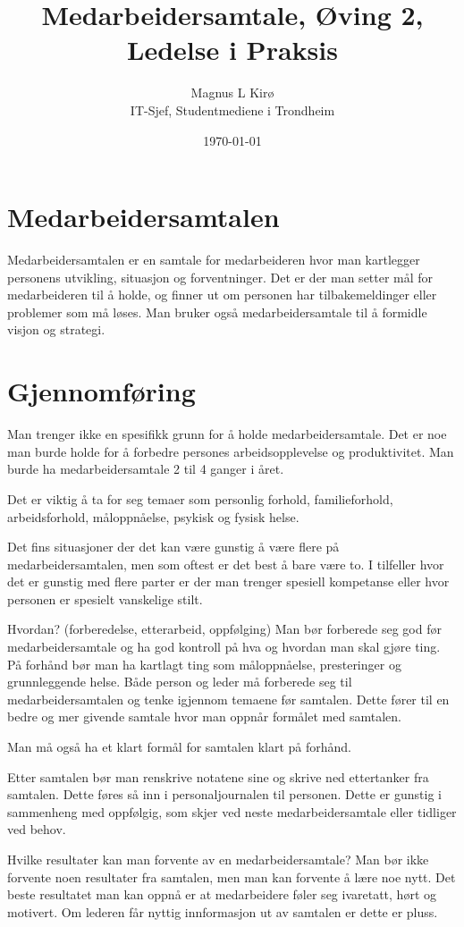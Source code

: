 \documentclass[12pt, a4paper]{article}
\title{
	Medarbeidersamtale, Øving 2, Ledelse i Praksis
}
\author{
	Magnus L Kirø \\
	IT-Sjef, Studentmediene i Trondheim 
}
\date{\today}
\begin{document}
\maketitle
{}

\section{Medarbeidersamtalen}
Medarbeidersamtalen er en samtale for medarbeideren hvor man
kartlegger personens utvikling, situasjon og forventninger. Det er der man
setter mål for medarbeideren til å holde, og finner ut om personen har
tilbakemeldinger eller problemer som må løses. 
Man bruker også medarbeidersamtale til å formidle visjon og strategi.

\section{Gjennomføring}
Man trenger ikke en spesifikk grunn for å holde medarbeidersamtale. Det er noe
man burde holde for å forbedre persones arbeidsopplevelse og produktivitet.
Man burde ha medarbeidersamtale 2 til 4 ganger i året. 

Det er viktig å ta for seg temaer som personlig forhold, familieforhold,
arbeidsforhold, måloppnåelse, psykisk og fysisk helse.

Det fins situasjoner der det kan være gunstig å være flere på
medarbeidersamtalen, men som oftest er det best å bare være to. I tilfeller
hvor det er gunstig med flere parter er der man trenger spesiell kompetanse
eller hvor personen er spesielt vanskelige stilt. 

Hvordan? (forberedelse, etterarbeid, oppfølging)
Man bør forberede seg god før medarbeidersamtale og ha god kontroll på hva og
hvordan man skal gjøre ting. På forhånd bør man ha kartlagt ting som
måloppnåelse, presteringer og grunnleggende helse. Både person og leder må
forberede seg til medarbeidersamtalen og tenke igjennom temaene før samtalen.
Dette fører til en bedre og mer givende samtale hvor man oppnår formålet med
samtalen. 

Man må også ha et klart formål for samtalen klart på forhånd.

Etter samtalen bør man renskrive notatene sine og skrive ned ettertanker fra
samtalen. Dette føres så inn i personaljournalen til personen. Dette er gunstig
i sammenheng med oppfølgig, som skjer ved neste medarbeidersamtale eller
tidliger ved behov.   

Hvilke resultater kan man
forvente av en medarbeidersamtale?
Man bør ikke forvente noen resultater fra samtalen, men man kan forvente å lære
noe nytt. Det beste resultatet man kan oppnå er at medarbeidere føler seg
ivaretatt, hørt og motivert. Om lederen får nyttig innformasjon ut av samtalen
er dette er pluss. 
\end{document}

